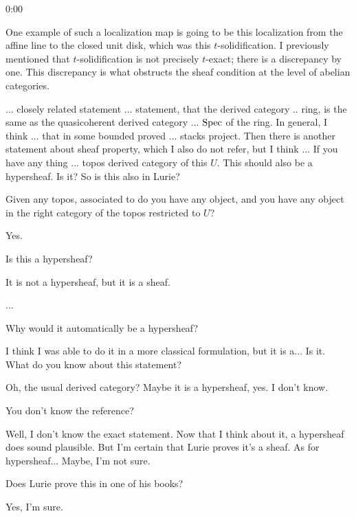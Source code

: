 \begin{unfinished}{0:00}
\begin{warning}
\end{warning}

\begin{example}
One example of such a localization map is going to be this localization from the affine line to the closed unit disk, which was this $t$-solidification. I previously mentioned that $t$-solidification is not precisely $t$-exact; there is a discrepancy by one. 
This discrepancy is what obstructs the sheaf condition at the level of abelian categories.

\end{example}

\ques ... closely related statement ... statement, that the derived category .. ring, is the same as the quasicoherent derived category ... $\operatorname{Spec}$ of the ring. In general, I think ... that in some bounded proved ... stacks project.
Then there is another statement about sheaf property, which I also do not refer, but I think ...
If you have any thing ... topos
derived category of this $U$. This should also be a hypersheaf. Is it? So is this also in Lurie?

% 

\ques Given any topos, associated to do you have any object, and you have any object in the right category of the topos restricted to $U$? 

\ans Yes.

\ques Is this a hypersheaf?

\ans It is not a hypersheaf, but it is a sheaf.

\ques ... 

\ans Why would it automatically be a hypersheaf?

% 
\gabber I think I was able to do it in a more classical formulation, but it is a... Is it. What do you know about this statement?

\ans Oh, the usual derived category? Maybe it is a hypersheaf, yes. I don't know.

\ques You don't know the reference?

\ans Well, I don't know the exact statement. Now that I think about it, a hypersheaf does sound plausible. But I'm certain that Lurie proves it's a sheaf. As for hypersheaf... Maybe, I'm not sure.

\ques Does Lurie prove this in one of his books?

\ans Yes, I'm sure.


\end{unfinished}

